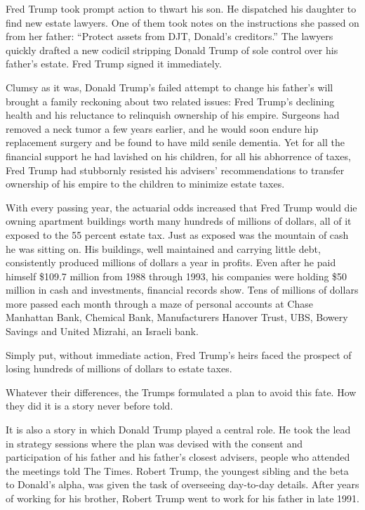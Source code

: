 Fred Trump took prompt action to thwart his son. He dispatched his
daughter to find new estate lawyers. One of them took notes on the
instructions she passed on from her father: ``Protect assets from DJT,
Donald's creditors.'' The lawyers quickly drafted a new codicil
stripping Donald Trump of sole control over his father's estate. Fred
Trump signed it immediately.

Clumsy as it was, Donald Trump's failed attempt to change his father's
will brought a family reckoning about two related issues: Fred Trump's
declining health and his reluctance to relinquish ownership of his
empire. Surgeons had removed a neck tumor a few years earlier, and he
would soon endure hip replacement surgery and be found to have mild
senile dementia. Yet for all the financial support he had lavished on
his children, for all his abhorrence of taxes, Fred Trump had stubbornly
resisted his advisers' recommendations to transfer ownership of his
empire to the children to minimize estate taxes.

With every passing year, the actuarial odds increased that Fred Trump
would die owning apartment buildings worth many hundreds of millions of
dollars, all of it exposed to the 55 percent estate tax. Just as exposed
was the mountain of cash he was sitting on. His buildings, well
maintained and carrying little debt, consistently produced millions of
dollars a year in profits. Even after he paid himself \$109.7 million
from 1988 through 1993, his companies were holding \$50 million in cash
and investments, financial records show. Tens of millions of dollars
more passed each month through a maze of personal accounts at Chase
Manhattan Bank, Chemical Bank, Manufacturers Hanover Trust, UBS, Bowery
Savings and United Mizrahi, an Israeli bank.

Simply put, without immediate action, Fred Trump's heirs faced the
prospect of losing hundreds of millions of dollars to estate taxes.

Whatever their differences, the Trumps formulated a plan to avoid this
fate. How they did it is a story never before told.

It is also a story in which Donald Trump played a central role. He took
the lead in strategy sessions where the plan was devised with the
consent and participation of his father and his father's closest
advisers, people who attended the meetings told The Times. Robert Trump,
the youngest sibling and the beta to Donald's alpha, was given the task
of overseeing day-to-day details. After years of working for his
brother, Robert Trump went to work for his father in late 1991.

